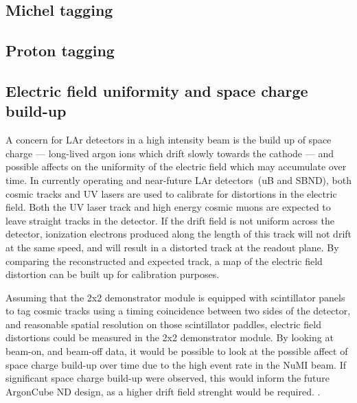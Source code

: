 \FloatBarrier
\subsection{Michel tagging}

\subsection{Proton tagging}

\subsection{Electric field uniformity and space charge build-up}
A concern for LAr detectors in a high intensity beam is the build up of space charge --- long-lived argon ions which drift slowly towards the cathode --- and possible affects on the uniformity of the electric field which may accumulate over time. In currently operating and near-future LAr detectors~\addcite (uB and SBND), both cosmic tracks and UV lasers are used to calibrate for distortions in the electric field. Both the UV laser track and high energy cosmic muons are expected to leave straight tracks in the detector. If the drift field is not uniform across the detector, ionization electrons produced along the length of this track will not drift at the same speed, and will result in a distorted track at the readout plane. By comparing the reconstructed and expected track, a map of the electric field distortion can be built up for calibration purposes.

Assuming that the 2x2 demonstrator module is equipped with scintillator panels to tag cosmic tracks using a timing coincidence between two sides of the detector, and reasonable spatial resolution on those scintillator paddles, electric field distortions could be measured in the 2x2 demonstrator module. By looking at beam-on, and beam-off data, it would be possible to look at the possible affect of space charge build-up over time due to the high event rate in the NuMI beam. If significant space charge build-up were observed, this would inform the future ArgonCube ND design, as a higher drift field strenght would be required. .

